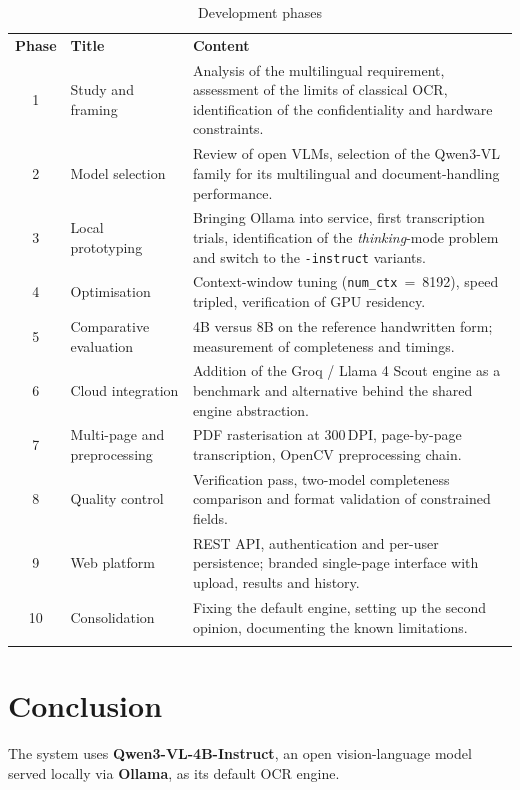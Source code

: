 \documentclass[11pt,a4paper]{article}
\newcommand{\toprule}{\noalign{\hrule height 0.9pt}\noalign{\vskip 3pt}}
\newcommand{\midrule}{\noalign{\vskip 3pt}\noalign{\hrule height 0.4pt}\noalign{\vskip 3pt}}
\newcommand{\bottomrule}{\noalign{\vskip 3pt}\noalign{\hrule height 0.9pt}}
\begin{document}
\begin{table}[H]
\centering
\begin{tabular}{@{}cL{3.6cm}L{9.0cm}@{}}
\toprule
\textbf{Phase} & \textbf{Title} & \textbf{Content} \\
\midrule
1 & Study and framing & Analysis of the multilingual requirement, assessment of
  the limits of classical OCR, identification of the confidentiality and
  hardware constraints. \\
2 & Model selection & Review of open VLMs, selection of the Qwen3-VL family for
  its multilingual and document-handling performance. \\
3 & Local prototyping & Bringing Ollama into service, first transcription
  trials, identification of the \emph{thinking}-mode problem and switch to the
  \texttt{-instruct} variants. \\
4 & Optimisation & Context-window tuning (\texttt{num\_ctx}~=~8192), speed
  tripled, verification of GPU residency. \\
5 & Comparative evaluation & 4B versus 8B on the reference handwritten form;
  measurement of completeness and timings. \\
6 & Cloud integration & Addition of the Groq / Llama 4 Scout engine as a
  benchmark and alternative behind the shared engine abstraction. \\
7 & Multi-page and preprocessing & PDF rasterisation at 300\,DPI, page-by-page
  transcription, OpenCV preprocessing chain. \\
8 & Quality control & Verification pass, two-model completeness comparison and
  format validation of constrained fields. \\
9 & Web platform & REST API, authentication and per-user persistence; branded
  single-page interface with upload, results and history. \\
10 & Consolidation & Fixing the default engine, setting up the second opinion,
  documenting the known limitations. \\
\bottomrule
\end{tabular}
\caption{Development phases}
\end{table}

\section{Conclusion}

The system uses \textbf{Qwen3-VL-4B-Instruct}, an open vision-language model
served locally via \textbf{Ollama}, as its default OCR engine.
\end{document}
